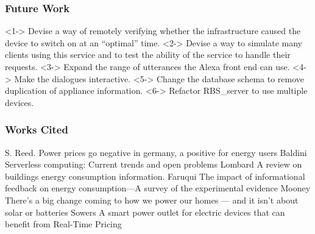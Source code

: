 \documentclass{beamer}
\begin{document}
\begin{frame}
    \frametitle{Future Work}
    \begin{outline}
        \1 <1-> Devise a way of remotely 
        verifying whether the infrastructure caused the device to switch on at an ``optimal'' time.
        \1 <2-> Devise a way to simulate many clients using this service and to test the ability of the service to handle their requests.
        \1 <3-> Expand the range of utterances the Alexa front end can use.
        \1 <4-> Make the dialogues interactive.
        \1 <5-> Change the database schema to remove duplication of appliance information.
        \1 <6-> Refactor RBS\_server to use
        multiple devices.
    \end{outline}
\end{frame}

\begin{frame}[allowframebreaks]
  \frametitle<presentation>{Works Cited}    
  \begin{thebibliography}{10}    
  \beamertemplatearticlebibitems
    S. Reed.
    \newblock Power prices go negative in germany, a positive for energy
users    
  \beamertemplatearticlebibitems
    Baldini
    \newblock Serverless computing: Current trends and open problems
  \beamertemplatearticlebibitems
    Lombard
    \newblock A review on buildings energy consumption information.
  \beamertemplatearticlebibitems
  Faruqui
    \newblock The impact of informational feedback on energy consumption—A survey of the experimental evidence
  \beamertemplatearticlebibitems
  Mooney
    \newblock There’s a big change coming to how we power our homes — and it isn’t about solar or batteries
  \beamertemplatearticlebibitems
  Sowers
    \newblock A smart power outlet for electric devices that can benefit from Real-Time Pricing
  \end{thebibliography}
\end{frame}
\end{document}
